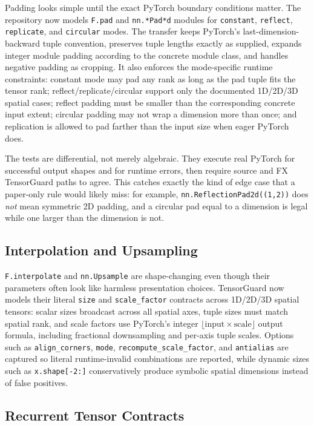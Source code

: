 \documentclass[11pt]{article}
\newcommand{\tg}{TensorGuard}
\begin{document}
Padding looks simple until the exact PyTorch boundary conditions matter.  The
repository now models \texttt{F.pad} and \texttt{nn.*Pad*d} modules for
\texttt{constant}, \texttt{reflect}, \texttt{replicate}, and \texttt{circular}
modes.  The transfer keeps PyTorch's last-dimension-backward tuple convention,
preserves tuple lengths exactly as supplied, expands integer module padding
according to the concrete module class, and handles negative padding as cropping.
It also enforces the mode-specific runtime constraints: constant mode may pad any
rank as long as the pad tuple fits the tensor rank; reflect/replicate/circular
support only the documented 1D/2D/3D spatial cases; reflect padding must be
smaller than the corresponding concrete input extent; circular padding may not
wrap a dimension more than once; and replication is allowed to pad farther than
the input size when eager PyTorch does.

The tests are differential, not merely algebraic.  They execute real PyTorch for
successful output shapes and for runtime errors, then require source and FX
TensorGuard paths to agree.  This catches exactly the kind of edge case that a
paper-only rule would likely miss: for example, \texttt{nn.ReflectionPad2d((1,2))}
does \emph{not} mean symmetric 2D padding, and a circular pad equal to a
dimension is legal while one larger than the dimension is not.

\subsection{Interpolation and Upsampling}

\texttt{F.interpolate} and \texttt{nn.Upsample} are shape-changing even though
their parameters often look like harmless presentation choices.  \tg{} now
models their literal \texttt{size} and \texttt{scale\_factor} contracts across
1D/2D/3D spatial tensors: scalar sizes broadcast across all spatial axes, tuple
sizes must match spatial rank, and scale factors use PyTorch's integer
\(\lfloor \mathrm{input}\times\mathrm{scale}\rfloor\) output formula, including
fractional downsampling and per-axis tuple scales.  Options such as
\texttt{align\_corners}, \texttt{mode}, \texttt{recompute\_scale\_factor}, and
\texttt{antialias} are captured so literal runtime-invalid combinations are
reported, while dynamic sizes such as \texttt{x.shape[-2:]} conservatively
produce symbolic spatial dimensions instead of false positives.

\subsection{Recurrent Tensor Contracts}
\end{document}
